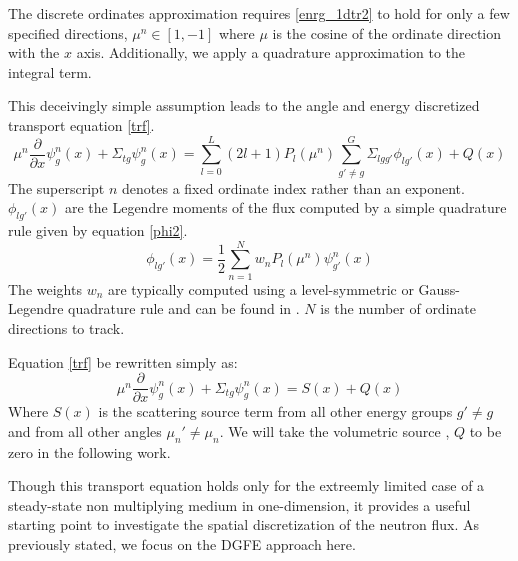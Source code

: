 The discrete ordinates approximation requires \ref{enrg_1dtr2} to hold for only a few specified directions, $\mu^n \in [1, -1]$ where $\mu$ is the cosine of the ordinate direction with the $x$ axis.  Additionally, we apply a quadrature approximation to the integral term.

This deceivingly simple assumption leads to the angle and energy discretized transport equation \ref{trf}.
\begin{equation}
    \mu^n \frac{\partial}{\partial x} \psi^n_{g}(x) + \Sigma_{tg} \psi^n_g(x) =
\sum_{l=0}^L (2l+1) P_l(\mu^n) 
\sum_{g'\neq g}^G \Sigma_{lgg'} \phi_{lg'}(x)
 + Q(x)
\label{trf}
\end{equation}
The superscript $n$ denotes a fixed ordinate index rather than an exponent.
$\phi_{lg'}(x)$ are the Legendre moments of the flux computed by a simple quadrature rule given by equation \ref{phi2}.
\begin{equation}
\phi_{lg'}(x) = \frac{1}{2}\sum_{n=1}^N w_n P_l(\mu^n)\psi^n_{g'}(x)
\label{phi2}
\end{equation}
The weights $w_n$ are typically computed using a level-symmetric or Gauss-Legendre quadrature rule and can be found in \cite{Lewis}.  $N$ is the number of ordinate directions to track.

Equation \ref{trf} be rewritten simply as:
\begin{equation}
    \mu^n \frac{\partial}{\partial x} \psi^n_{g}(x) + \Sigma_{tg} \psi^n_g(x) = S(x) + Q(x)
\label{g_mu_treq}
\end{equation}
Where $S(x)$ is the scattering source term from all other energy groups $g' \neq g$ and from all other angles $\mu_n' \ne \mu_n$.  We will take the volumetric source , $Q$ to be zero in the following work.

Though this transport equation holds only for the extreemly limited case of a steady-state non multiplying medium in one-dimension, it provides a useful starting point to investigate the spatial discretization of the neutron flux.
As previously stated, we focus on the DGFE approach here.
